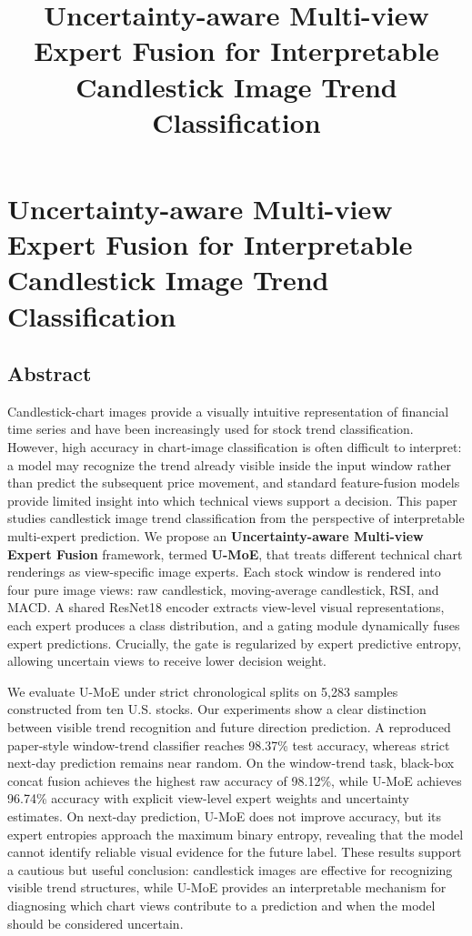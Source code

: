 \documentclass[
]{article}
\title{Uncertainty-aware Multi-view Expert Fusion for Interpretable
Candlestick Image Trend Classification}
\author{}
\date{}
\begin{document}
\maketitle

\section{Uncertainty-aware Multi-view Expert Fusion for Interpretable
Candlestick Image Trend
Classification}\label{uncertainty-aware-multi-view-expert-fusion-for-interpretable-candlestick-image-trend-classification}

\subsection{Abstract}\label{abstract}

Candlestick-chart images provide a visually intuitive representation of
financial time series and have been increasingly used for stock trend
classification. However, high accuracy in chart-image classification is
often difficult to interpret: a model may recognize the trend already
visible inside the input window rather than predict the subsequent price
movement, and standard feature-fusion models provide limited insight
into which technical views support a decision. This paper studies
candlestick image trend classification from the perspective of
interpretable multi-expert prediction. We propose an
\textbf{Uncertainty-aware Multi-view Expert Fusion} framework, termed
\textbf{U-MoE}, that treats different technical chart renderings as
view-specific image experts. Each stock window is rendered into four
pure image views: raw candlestick, moving-average candlestick, RSI, and
MACD. A shared ResNet18 encoder extracts view-level visual
representations, each expert produces a class distribution, and a gating
module dynamically fuses expert predictions. Crucially, the gate is
regularized by expert predictive entropy, allowing uncertain views to
receive lower decision weight.

We evaluate U-MoE under strict chronological splits on 5,283 samples
constructed from ten U.S. stocks. Our experiments show a clear
distinction between visible trend recognition and future direction
prediction. A reproduced paper-style window-trend classifier reaches
98.37\% test accuracy, whereas strict next-day prediction remains near
random. On the window-trend task, black-box concat fusion achieves the
highest raw accuracy of 98.12\%, while U-MoE achieves 96.74\% accuracy
with explicit view-level expert weights and uncertainty estimates. On
next-day prediction, U-MoE does not improve accuracy, but its expert
entropies approach the maximum binary entropy, revealing that the model
cannot identify reliable visual evidence for the future label. These
results support a cautious but useful conclusion: candlestick images are
effective for recognizing visible trend structures, while U-MoE provides
an interpretable mechanism for diagnosing which chart views contribute
to a prediction and when the model should be considered uncertain.
\end{document}

